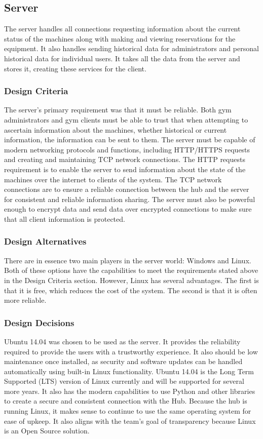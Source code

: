 \documentclass[PPFS.tex]{template/subfiles}
\begin{document}
\subsection{Server}
The server handles all connections requesting information about the current status of the machines along with making and viewing reservations for the equipment. It also handles sending historical data for administrators and personal historical data for individual users. It takes all the data from the server and stores it, creating these services for the client.

\subsubsection{Design Criteria}
The server's primary requirement was that it must be reliable. Both gym administrators and gym clients must be able to trust that when attempting to ascertain information about the machines, whether historical or current information, the information can be sent to them. The server must be capable of modern networking protocols and functions, including HTTP/HTTPS requests and creating and maintaining TCP network connections. The HTTP requests requirement is to enable the server to send information about the state of the machines over the internet to clients of the system. The TCP network connections are to ensure a reliable connection between the hub and the server for consistent and reliable information sharing. The server must also be powerful enough to encrypt data and send data over encrypted connections to make sure that all client information is protected.

\subsubsection{Design Alternatives}
There are in essence two main players in the server world: Windows and Linux. Both of these options have the capabilities to meet the requirements stated above in the Design Criteria section. However, Linux has several advantages. The first is that it is free, which reduces the cost of the system. The second is that it is often more
reliable.

\subsubsection{Design Decisions}
Ubuntu 14.04 was chosen to be used as the server. It provides the reliability required to provide the users with a trustworthy experience. It also should be low maintenance once installed, as security and software updates can be handled automatically using built-in Linux functionality. Ubuntu 14.04 is the Long Term Supported (LTS) version of Linux currently and will be supported for
several more years. It also has the modern capabilities to use Python and other libraries to create a secure and consistent connection with the Hub. Because the hub is running Linux, it makes sense to continue to use the same operating system for ease of upkeep. It also aligns with the team's goal of transparency because Linux is an Open Source solution.
\end{document}
